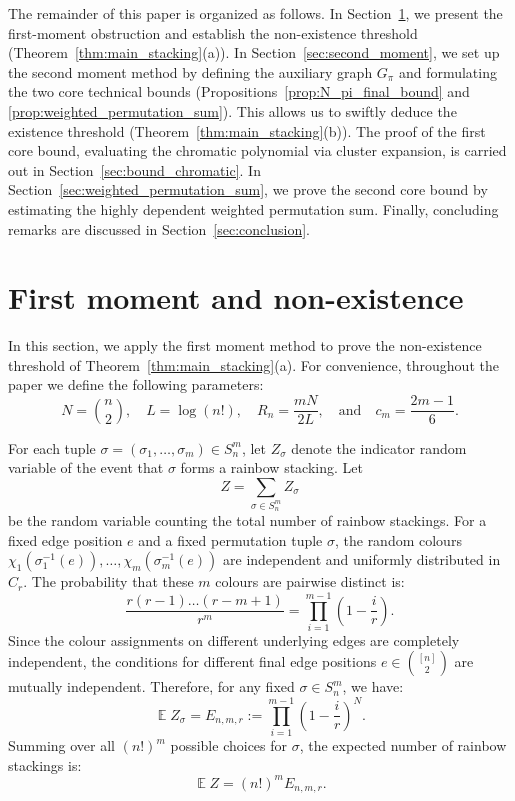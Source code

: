\documentclass[11pt,reqno]{amsart}
\theoremstyle{definition}
\theoremstyle{remark}
\newcommand\E{\operatorname{\mathbb{E}}}
\begin{document}
The remainder of this paper is organized as follows. In Section~\ref{sec:first_moment}, we present the first-moment obstruction and establish the non-existence threshold (Theorem~\ref{thm:main_stacking}(a)). In Section~\ref{sec:second_moment}, we set up the second moment method by defining the auxiliary graph $G_\pi$ and formulating the two core technical bounds (Propositions~\ref{prop:N_pi_final_bound} and \ref{prop:weighted_permutation_sum}). This allows us to swiftly deduce the existence threshold (Theorem~\ref{thm:main_stacking}(b)). The proof of the first core bound, evaluating the chromatic polynomial via cluster expansion, is carried out in Section~\ref{sec:bound_chromatic}. In Section~\ref{sec:weighted_permutation_sum}, we prove the second core bound by estimating the highly dependent weighted permutation sum. Finally, concluding remarks are discussed in Section~\ref{sec:conclusion}.



\section{First moment and non-existence}\label{sec:first_moment}

In this section, we apply the first moment method to prove the non-existence threshold of Theorem~\ref{thm:main_stacking}(a). For convenience, throughout the paper we define the following parameters:
\[ N = \binom{n}{2}, \quad L = \log(n!), \quad R_{n} = \frac{mN}{2L}, \quad \text{and} \quad c_{m} = \frac{2m-1}{6}. \]

For each tuple $\sigma = (\sigma_1, \dots, \sigma_m) \in S_n^m$, let $Z_\sigma$ denote the indicator random variable of the event that $\sigma$ forms a rainbow stacking. Let 
$$Z = \sum_{\sigma \in S_n^m} Z_\sigma$$
be the random variable counting the total number of rainbow stackings. For a fixed edge position $e$ and a fixed permutation tuple $\sigma$, the random colours $\chi_1(\sigma_1^{-1}(e)), \dots, \chi_m(\sigma_m^{-1}(e))$ are independent and uniformly distributed in $C_r$. The probability that these $m$ colours are pairwise distinct is:
\[ \frac{r(r-1)\dots(r-m+1)}{r^m} = \prod_{i=1}^{m-1} \left(1 - \frac{i}{r}\right). \]
Since the colour assignments on different underlying edges are completely independent, the conditions for different final edge positions $e \in \binom{[n]}{2}$ are mutually independent. Therefore, for any fixed $\sigma \in S_n^m$, we have:
\begin{equation} \label{eq:EZ_sigma}
\E Z_\sigma = E_{n,m,r} := \prod_{i=1}^{m-1} \left(1 - \frac{i}{r}\right)^N.
\end{equation}
Summing over all $(n!)^m$ possible choices for $\sigma$, the expected number of rainbow stackings is:
\begin{equation} \label{eq:EZ_total}
\E Z = (n!)^m E_{n,m,r}.
\end{equation}
\end{document}
